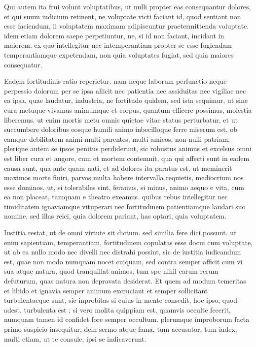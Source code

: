  Qui autem ita frui volunt voluptatibus, ut nulli propter eas consequantur dolores, et qui suum iudicium retinent, ne voluptate victi faciant id, quod sentiant non esse faciendum, ii voluptatem maximam adipiscuntur praetermittenda voluptate. idem etiam dolorem saepe perpetiuntur, ne, si id non faciant, incidant in maiorem. ex quo intellegitur nec intemperantiam propter se esse fugiendam temperantiamque expetendam, non quia voluptates fugiat, sed quia maiores consequatur.

 Eadem fortitudinis ratio reperietur. nam neque laborum perfunctio neque perpessio dolorum per se ipsa allicit nec patientia nec assiduitas nec vigiliae nec ea ipsa, quae laudatur, industria, ne fortitudo quidem, sed ista sequimur, ut sine cura metuque vivamus animumque et corpus, quantum efficere possimus, molestia liberemus. ut enim mortis metu omnis quietae vitae status perturbatur, et ut succumbere doloribus eosque humili animo inbecilloque ferre miserum est, ob eamque debilitatem animi multi parentes, multi amicos, non nulli patriam, plerique autem se ipsos penitus perdiderunt, sic robustus animus et excelsus omni est liber cura et angore, cum et mortem contemnit, qua qui affecti sunt in eadem causa sunt, qua ante quam nati, et ad dolores ita paratus est, ut meminerit maximos morte finiri, parvos multa habere intervalla requietis, mediocrium nos esse dominos, ut, si tolerabiles sint, feramus, si minus, animo aequo e vita, cum ea non placeat, tamquam e theatro exeamus. quibus rebus intellegitur nec timiditatem ignaviamque vituperari nec fortitudinem patientiamque laudari suo nomine, sed illas reici, quia dolorem pariant, has optari, quia voluptatem.

 Iustitia restat, ut de omni virtute sit dictum. sed similia fere dici possunt. ut enim sapientiam, temperantiam, fortitudinem copulatas esse docui cum voluptate, ut ab ea nullo modo nec divelli nec distrahi possint, sic de iustitia iudicandum est, quae non modo numquam nocet cuiquam, sed contra semper afficit cum vi sua atque natura, quod tranquillat animos, tum spe nihil earum rerum defuturum, quas natura non depravata desiderat. Et quem ad modum temeritas et libido et ignavia semper animum excruciant et semper sollicitant turbulentaeque sunt, sic inprobitas si cuius in mente consedit, hoc ipso, quod adest, turbulenta est ; si vero molita quippiam est, quamvis occulte fecerit, numquam tamen id confidet fore semper occultum. plerumque improborum facta primo suspicio insequitur, dein sermo atque fama, tum accusator, tum iudex; multi etiam, ut te consule, ipsi se indicaverunt.

